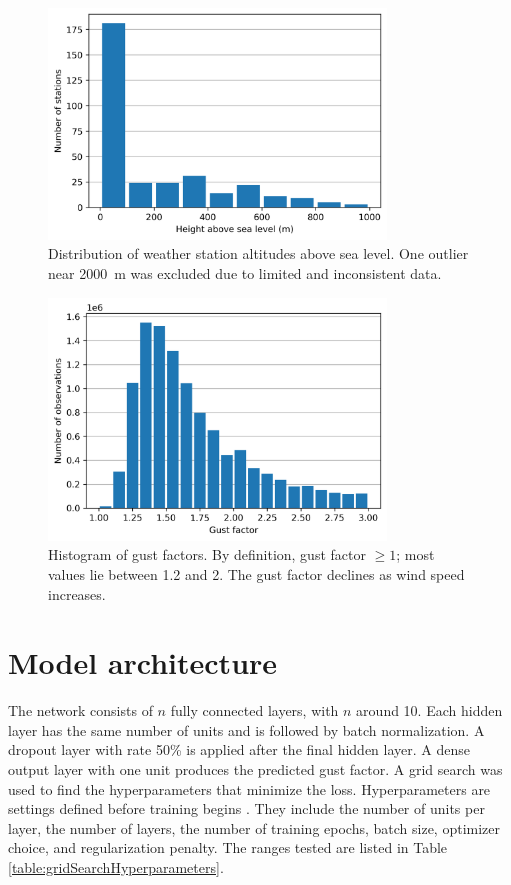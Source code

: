 \begin{figure}[ht]
  \centering
  \includegraphics[width=0.8\textwidth]{Figures/station_heights.png}
  \caption{Distribution of weather station altitudes above sea level. One outlier near 2000~m was excluded due to limited and inconsistent data.}
  \label{fig:station_heights}
\end{figure}

\begin{figure}[ht]
  \centering
  \includegraphics[width=0.8\textwidth]{Figures/gust_factor_2025.png}
  \caption{Histogram of gust factors. By definition, gust factor $\ge1$; most values lie between 1.2 and 2. The gust factor declines as wind speed increases.}
  \label{fig:gust_factors}
\end{figure}

\section{Model architecture}
\label{sec:model_architecture}

The network consists of $n$ fully connected layers, with $n$ around 10. Each hidden layer has the same number of units and is followed by batch normalization. A dropout layer with rate 50\% is applied after the final hidden layer. A dense output layer with one unit produces the predicted gust factor. A grid search was used to find the hyperparameters that minimize the loss. Hyperparameters are settings defined before training begins \cite{hyperparameters_definition}. They include the number of units per layer, the number of layers, the number of training epochs, batch size, optimizer choice, and regularization penalty. The ranges tested are listed in Table \ref{table:gridSearchHyperparameters}.


